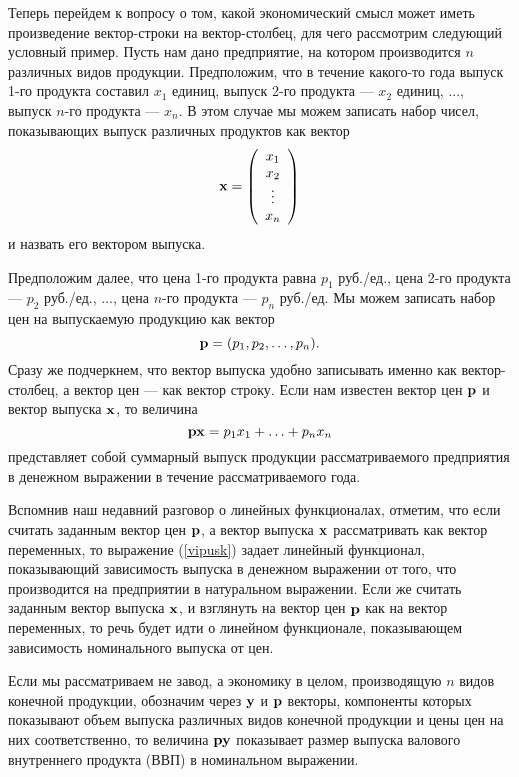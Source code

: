     Теперь перейдем к вопросу о том, какой экономический смысл может
    иметь произведение вектор-строки на вектор-столбец, для чего рассмотрим следующий
    условный пример. Пусть нам дано предприятие, на котором производится
    $n$ различных видов
    продукции. Предположим, что в течение какого-то года выпуск
    1-го продукта составил $x_{1}$ единиц, выпуск 2-го продукта ---
    $x_{2}$ единиц, ..., выпуск $n$-го продукта --- $x_{n}$. В этом
    случае мы можем записать набор чисел, показывающих выпуск
    различных продуктов как вектор
        \[\mathbf{x}=\left(
     \begin{array}{c}
        x_{1} \\
        x_{2} \\
        \vdots \\
        x_{n}  \\
      \end{array}
    \right)\]
    и назвать его вектором выпуска.

    Предположим далее, что цена 1-го продукта равна $p_{1}$
    руб./ед., цена 2-го продукта --- $p_{2}$ руб./ед., ...,
    цена $n$-го продукта --- $p_{n}$ руб./ед. Мы можем записать набор цен на
    выпускаемую продукцию как вектор
    \[\mathbf{p}=(p_{1}, p_{2},\ldots,p_{n}).\]
    Сразу же подчеркнем, что вектор выпуска удобно записывать именно как
    вектор-столбец, а вектор цен --- как вектор строку.
        Если нам известен вектор цен $\mathbf{p}$ и вектор выпуска $\mathbf{x}$,
    то величина
\begin{equation} \label{vipusk}
    \mathbf{p}\mathbf{x}=p_{1}x_{1}+\ldots+p_{n}x_{n}
\end{equation}
     представляет собой суммарный выпуск продукции рассматриваемого
     предприятия в денежном выражении в течение рассматриваемого
     года.

     Вспомнив наш недавний разговор о линейных функционалах,
     отметим, что если считать заданным вектор цен $\mathbf{p}$, а
     вектор выпуска $\mathbf{x}$ рассматривать как вектор переменных, то
     выражение (\ref{vipusk}) задает линейный функционал,
     показывающий зависимость выпуска  в денежном
     выражении от того, что производится
     на предприятии в натуральном выражении. Если же считать заданным
     вектор выпуска $\mathbf{x}$, и взглянуть на вектор цен $\mathbf{p}$ как
     на вектор переменных, то речь будет идти о линейном
     функционале, показывающем зависимость номинального выпуска от
     цен.

     Если мы рассматриваем не завод, а экономику в целом, производящую $n$
     видов конечной продукции, обозначим через $\mathbf{y}$ и $\mathbf{p}$
     векторы, компоненты которых показывают объем выпуска различных
     видов конечной продукции и цены цен на них соответственно, то величина
     $\mathbf{p}\mathbf{y}$ показывает размер выпуска валового внутреннего продукта
     (ВВП) в номинальном выражении.

